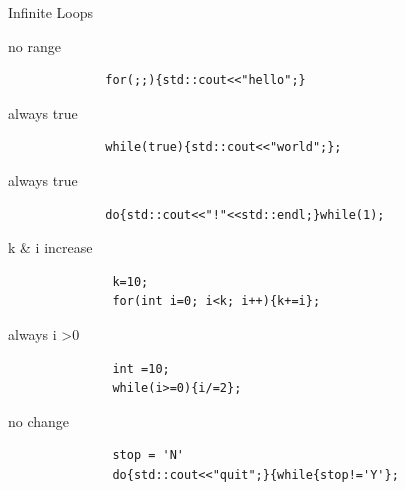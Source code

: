 \documentclass[xcolor={dvipsnames}]{beamer}
\begin{document}
\begin{frame}[fragile]{Infinite Loops}
	\begin{description}
	\item[no range]
	\begin{verbatim}
		for(;;){std::cout<<"hello";}
	\end{verbatim}

	\item[always true]
	\begin{verbatim}
		while(true){std::cout<<"world";};
	\end{verbatim}
	\item[always true]
	\begin{verbatim}
		do{std::cout<<"!"<<std::endl;}while(1);
	\end{verbatim}

	\item[k \& i increase]
	\begin{verbatim}
	     k=10;
	     for(int i=0; i<k; i++){k+=i};
	\end{verbatim}

	\item[always i \textgreater 0]
	\begin{verbatim}
	     int =10;
	     while(i>=0){i/=2};
	\end{verbatim}
	
	\item[no change]
	\begin{verbatim}
	     stop = 'N'
	     do{std::cout<<"quit";}{while{stop!='Y'};
	\end{verbatim}

	\end{description}
	
\end{frame}
\end{document}
